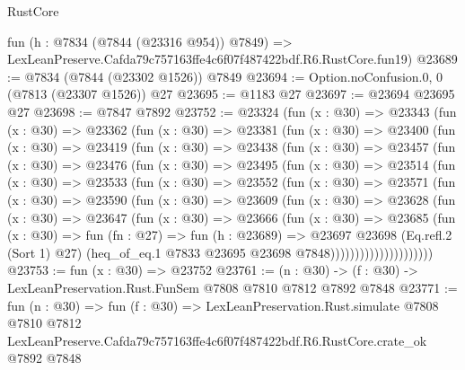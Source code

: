 \begin{lexlean}{RustCore}
\begin{coremodule}
    fun (h : @7834 (@7844 (@23316 @954)) @7849) =>
    LexLeanPreserve.Cafda79c757163ffe4c6f07f487422bdf.R6.RustCore.fun19)
@23689 := @7834 (@7844 (@23302 @1526)) @7849
@23694 := Option.noConfusion.{0, 0} (@7813 (@23307 @1526)) @27
@23695 := @1183 @27
@23697 := @23694 @23695 @27
@23698 := @7847 @7892
@23752 := @23324
    (fun (x : @30) =>
    @23343
      (fun (x : @30) =>
      @23362
        (fun (x : @30) =>
        @23381
          (fun (x : @30) =>
          @23400
            (fun (x : @30) =>
            @23419
              (fun (x : @30) =>
              @23438
                (fun (x : @30) =>
                @23457
                  (fun (x : @30) =>
                  @23476
                    (fun (x : @30) =>
                    @23495
                      (fun (x : @30) =>
                      @23514
                        (fun (x : @30) =>
                        @23533
                          (fun (x : @30) =>
                          @23552
                            (fun (x : @30) =>
                            @23571
                              (fun (x : @30) =>
                              @23590
                                (fun (x : @30) =>
                                @23609
                                  (fun (x : @30) =>
                                  @23628
                                    (fun (x : @30) =>
                                    @23647
                                      (fun (x : @30) =>
                                      @23666
                                        (fun (x : @30) =>
                                        @23685
                                          (fun (x : @30) =>
                                          fun (fn : @27) =>
                                          fun (h : @23689) =>
                                          @23697
                                            @23698
                                            (Eq.refl.{2} (Sort 1) @27)
                                            (heq_of_eq.{1}
                                              @7833
                                              @23695
                                              @23698
                                              @7848)))))))))))))))))))))
@23753 := fun (x : @30) => @23752
@23761 := (n : @30) -> (f : @30) -> LexLeanPreservation.Rust.FunSem @7808 @7810 @7812 @7892 @7848
@23771 := fun (n : @30) =>
  fun (f : @30) =>
  LexLeanPreservation.Rust.simulate
    @7808
    @7810
    @7812
    LexLeanPreserve.Cafda79c757163ffe4c6f07f487422bdf.R6.RustCore.crate_ok
    @7892
    @7848
\end{coremodule}
\end{lexlean}

